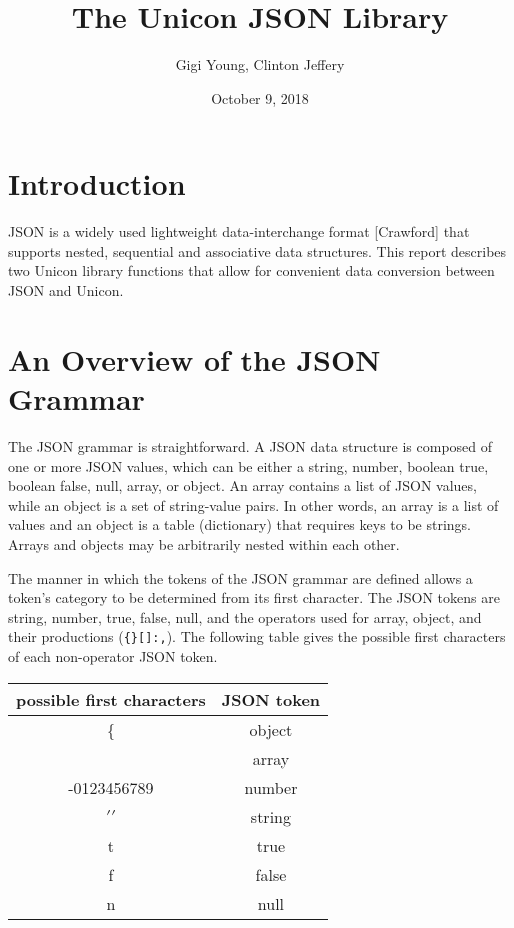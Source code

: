 \documentclass[letterpaper,12pt]{article}
\title{The Unicon JSON Library}
\author{Gigi Young, Clinton Jeffery}
\date{October 9, 2018}
\begin{document}
\maketitle

\section{Introduction}

JSON is a widely used lightweight data-interchange format [Crawford]
that supports nested, sequential and associative data structures.
This report describes two Unicon library
functions that allow for convenient data conversion
between JSON and Unicon.

\section{An Overview of the JSON Grammar}

The JSON grammar is straightforward. A JSON data structure is composed
of one or more JSON values, which can be either a string, number,
boolean true, boolean false, null, array, or object. An array contains
a list of JSON values, while an object is a set of string-value
pairs. In other words, an array is a list of values and an object is a
table (dictionary) that requires keys to be strings.
Arrays and objects may be arbitrarily nested within each other.

The manner in which the tokens of the JSON grammar are defined allows
a token's category to be determined from its first character. The JSON
tokens are string, number, true, false, null, and the operators used
for array, object, and their productions (\texttt{\{\}[]:,}). The
following table gives the possible first characters of each
non-operator JSON token.

\begin{center}
\begin{tabular}{ c | c }
 possible first characters  & JSON token \\
 \hline
 \{                         & object \\
 \verb [                    & array \\
 -0123456789                & number \\
 $\prime\prime$             & string \\
 t                          & true \\
 f                          & false \\
 n                          & null \\

\end{tabular}
\end{center}
\end{document}
